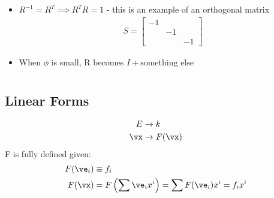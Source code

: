 \documentclass[cplx.tex]{subfiles}
\begin{document}
\begin{itemize}
    \item $R^{-1} = R^T \implies R^TR = 1$ - this is an example of an orthogonal matrix
        \begin{align}
            S = \begin{bmatrix} -1 & & \\ & -1 & \\ & & -1 \end{bmatrix}
        \end{align}
    \item When $\phi$ is small, R becomes $I + \text{something else}$
\end{itemize}

\chapter{}
\section{Linear Forms}
\begin{align}
    E &\to k \\
    \vx &\to F(\vx)
\end{align}
F is fully defined given:
\begin{align}
    F(\ve_i) &\equiv f_i \\
    F(\vx) &= F\left(\sum \ve_i x^i\right) = \sum F(\ve_i)x^i = f_ix^i
\end{align}
\end{document}
